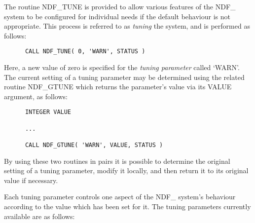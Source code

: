 \documentclass[twoside,11pt]{article}
\newcommand{\htmlref}[2]{#1}
\newcommand{\st}[1]{{\em{#1}}}
\begin{document}
The routine \htmlref{NDF\_TUNE}{NDF_TUNE} is provided to allow various features of the
NDF\_ system to be configured for individual needs if the default
behaviour is not appropriate.  This process is referred to as
\st{tuning} the system, and is performed as follows: 

\small
\begin{verbatim}
      CALL NDF_TUNE( 0, 'WARN', STATUS )
\end{verbatim}
\normalsize

Here, a new value of zero is specified for the \st{tuning parameter}
called `WARN'. The current setting of a tuning parameter may be
determined using the related routine \htmlref{NDF\_GTUNE}{NDF_GTUNE} which returns the
parameter's value via its VALUE argument, as follows:

\small
\begin{verbatim}
      INTEGER VALUE

      ...

      CALL NDF_GTUNE( 'WARN', VALUE, STATUS )
\end{verbatim}
\normalsize

By using these two routines in pairs it is possible to determine the original
setting of a tuning parameter, modify it locally, and then return it to its
original value if necessary.

Each tuning parameter controls one aspect of the NDF\_ system's
behaviour according to the value which has been set for it. The tuning
parameters currently available are as follows:
\end{document}
